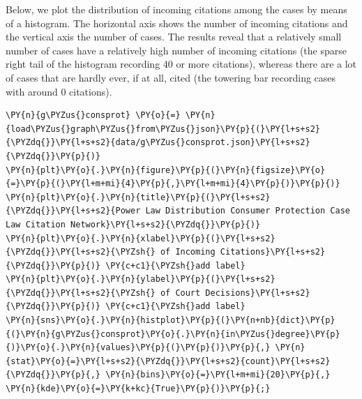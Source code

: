 Below, we plot the distribution of incoming citations among the cases by
means of a histogram. The horizontal axis shows the number of incoming
citations and the vertical axis the number of cases. The results reveal
that a relatively small number of cases have a relatively high number of
incoming citations (the sparse right tail of the histogram recording 40
or more citations), whereas there are a lot of cases that are hardly
ever, if at all, cited (the towering bar recording cases with around 0
citations).

    \begin{tcolorbox}[breakable, size=fbox, boxrule=1pt, pad at break*=1mm,colback=cellbackground, colframe=cellborder]
\begin{Verbatim}[commandchars=\\\{\}]
\PY{n}{g\PYZus{}consprot} \PY{o}{=} \PY{n}{load\PYZus{}graph\PYZus{}from\PYZus{}json}\PY{p}{(}\PY{l+s+s2}{\PYZdq{}}\PY{l+s+s2}{data/g\PYZus{}consprot.json}\PY{l+s+s2}{\PYZdq{}}\PY{p}{)}
\PY{n}{plt}\PY{o}{.}\PY{n}{figure}\PY{p}{(}\PY{n}{figsize}\PY{o}{=}\PY{p}{(}\PY{l+m+mi}{4}\PY{p}{,}\PY{l+m+mi}{4}\PY{p}{)}\PY{p}{)}
\PY{n}{plt}\PY{o}{.}\PY{n}{title}\PY{p}{(}\PY{l+s+s2}{\PYZdq{}}\PY{l+s+s2}{Power Law Distribution Consumer Protection Case Law Citation Network}\PY{l+s+s2}{\PYZdq{}}\PY{p}{)}
\PY{n}{plt}\PY{o}{.}\PY{n}{xlabel}\PY{p}{(}\PY{l+s+s2}{\PYZdq{}}\PY{l+s+s2}{\PYZsh{} of Incoming Citations}\PY{l+s+s2}{\PYZdq{}}\PY{p}{)} \PY{c+c1}{\PYZsh{}add label}
\PY{n}{plt}\PY{o}{.}\PY{n}{ylabel}\PY{p}{(}\PY{l+s+s2}{\PYZdq{}}\PY{l+s+s2}{\PYZsh{} of Court Decisions}\PY{l+s+s2}{\PYZdq{}}\PY{p}{)} \PY{c+c1}{\PYZsh{}add label}
\PY{n}{sns}\PY{o}{.}\PY{n}{histplot}\PY{p}{(}\PY{n+nb}{dict}\PY{p}{(}\PY{n}{g\PYZus{}consprot}\PY{o}{.}\PY{n}{in\PYZus{}degree}\PY{p}{)}\PY{o}{.}\PY{n}{values}\PY{p}{(}\PY{p}{)}\PY{p}{,} \PY{n}{stat}\PY{o}{=}\PY{l+s+s2}{\PYZdq{}}\PY{l+s+s2}{count}\PY{l+s+s2}{\PYZdq{}}\PY{p}{,} \PY{n}{bins}\PY{o}{=}\PY{l+m+mi}{20}\PY{p}{,} \PY{n}{kde}\PY{o}{=}\PY{k+kc}{True}\PY{p}{)}\PY{p}{;} 
\end{Verbatim}
\end{tcolorbox}

    \begin{center}
    \end{center}
    { \hspace*{\fill} \\}
    
